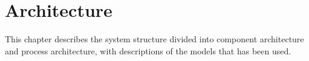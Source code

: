 \chapter{Architecture} \label{Architecture}
This chapter describes the system structure divided into component architecture and process architecture, with descriptions of the models that has been used.



